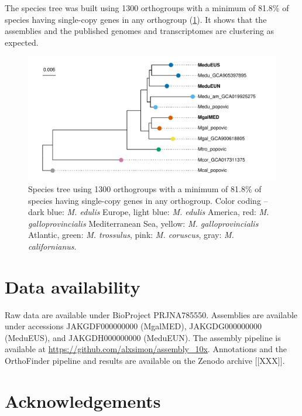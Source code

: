 \documentclass[11pt, a4paper]{article}
\begin{document}
The species tree was built using 1300 orthogroups with a minimum of 81.8\% of species having single-copy genes in any orthogroup (\cref{fig:tree}).
It shows that the assemblies and the published genomes and transcriptomes are clustering as expected.

\begin{figure}[h]
	\includegraphics[width=\linewidth]{figures/Fig3_tree.pdf}
	\caption{Species tree using 1300 orthogroups with a minimum of 81.8\% of species having single-copy genes in any orthogroup.
	Color coding -- dark blue: \textit{M. edulis} Europe, light blue: \textit{M. edulis} America,
	red: \textit{M. galloprovincialis} Mediterranean Sea, yellow: \textit{M. galloprovincialis} Atlantic,
	green: \textit{M. trossulus}, pink: \textit{M. coruscus}, gray: \textit{M. californianus}.
	}
	\label{fig:tree}
\end{figure}




\section*{Data availability}

Raw data are available under BioProject PRJNA785550.
Assemblies are available under accessions JAKGDF000000000 (MgalMED), JAKGDG000000000 (MeduEUS), and JAKGDH000000000 (MeduEUN).
The assembly pipeline is available at \url{https://github.com/alxsimon/assembly_10x}.
Annotations and the OrthoFinder pipeline and results are available on the Zenodo archive [[XXX]].


\section*{Acknowledgements}
\end{document}
